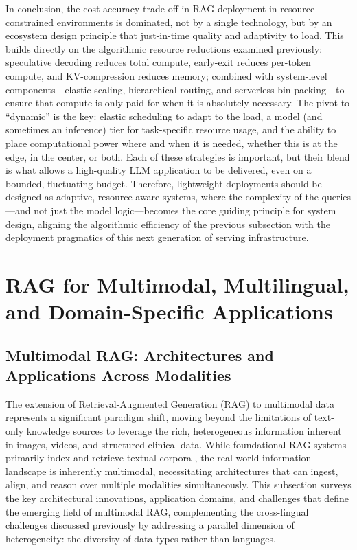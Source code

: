 \documentclass[11pt]{article}
\begin{document}
In conclusion, the cost-accuracy trade-off in RAG deployment in resource-constrained environments is dominated, not by a single technology, but by an ecosystem design principle that just-in-time quality and adaptivity to load. This builds directly on the algorithmic resource reductions examined previously: speculative decoding reduces total compute, early-exit reduces per-token compute, and KV-compression reduces memory; combined with system-level components---elastic scaling, hierarchical routing, and serverless bin packing---to ensure that compute is only paid for when it is absolutely necessary. The pivot to ``dynamic'' is the key: elastic scheduling to adapt to the load, a model (and sometimes an inference) tier for task-specific resource usage, and the ability to place computational power where and when it is needed, whether this is at the edge, in the center, or both. Each of these strategies is important, but their blend is what allows a high-quality LLM application to be delivered, even on a bounded, fluctuating budget. Therefore, lightweight deployments should be designed as adaptive, resource-aware systems, where the complexity of the queries---and not just the model logic---becomes the core guiding principle for system design, aligning the algorithmic efficiency of the previous subsection with the deployment pragmatics of this next generation of serving infrastructure.

\section{RAG for Multimodal, Multilingual, and Domain-Specific Applications}

\subsection{Multimodal RAG: Architectures and Applications Across Modalities}

The extension of Retrieval-Augmented Generation (RAG) to multimodal data represents a significant paradigm shift, moving beyond the limitations of text-only knowledge sources to leverage the rich, heterogeneous information inherent in images, videos, and structured clinical data. While foundational RAG systems primarily index and retrieve textual corpora \cite{ref23}, the real-world information landscape is inherently multimodal, necessitating architectures that can ingest, align, and reason over multiple modalities simultaneously. This subsection surveys the key architectural innovations, application domains, and challenges that define the emerging field of multimodal RAG, complementing the cross-lingual challenges discussed previously by addressing a parallel dimension of heterogeneity: the diversity of data types rather than languages.
\end{document}
